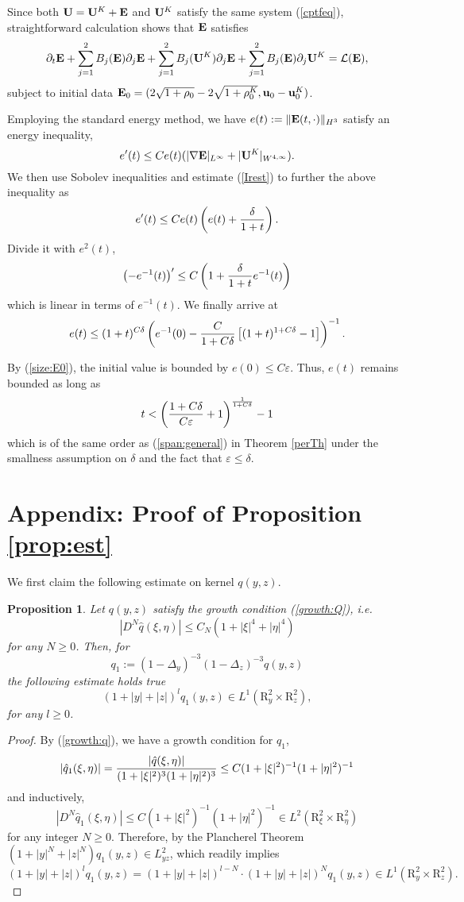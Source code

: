 \documentclass[12pt]{amsart}
\newtheorem{proposition}{Proposition}[section]
\numberwithin{equation}{section} \numberwithin{theorem}{section}
\numberwithin{example}{section} \numberwithin{remark}{section}
\numberwithin{figure}{section} \numberwithin{algorithm}{section}
\def\ep{\varepsilon}
\def\be{\begin{equation}}
\def\ee{\end{equation}}
\def\vu{{\bf u}}
\def\vU{{\bf U}}
\def\vE{{\bf E}}
\def\pa{\partial}
\def\cL{{\mathcal L}}
\def\mR{\mbox{R}}
\def\veps{\varepsilon}
\def\rhoK{\rho^K}
\def\vuK{{\bf u}^K}
\begin{document}
Since both $\vU=\vU^K+\vE$ and $\vU^{K}$ satisfy the same system (\ref{cptfeq}), straightforward calculation shows that $\vE$ satisfies
\[\pa_t\vE+\sum_{j=1}^2B_j(\vE)\pa_j\vE+\sum_{j=1}^2B_j(\vU^K)\pa_j\vE+\sum_{j=1}^2B_j(\vE)\pa_j\vU^K=\cL(\vE),\]
subject to initial data $\vE_0=(2\sqrt{1+\rho_0}-2\sqrt{1+\rhoK_0}, \vu_0-\vuK_0)$.

Employing the standard energy method, we have $e(t):=\|\vE(t,\cdot)\|_{H^3}$ satisfy an energy inequality,
\[e'(t)\le Ce(t)(|\nabla\vE|_{L^\infty}+|\vU^K|_{W^{4,\infty}}).\]
We then use Sobolev inequalities and estimate (\ref{Irest}) to further the above inequality as
\[e'(t)\le Ce(t)\left(e(t)+{\delta\over1+t}\right).\]
Divide it with $e^2(t)$,
\[\left(-e^{-1}(t)\right)'\le C\left(1+{\delta\over1+t}e^{-1}(t)\right)\]which is linear in terms of $e^{-1}(t)$. We finally arrive at
\[e(t)\le(1+t)^{C\delta}\left(e^{-1}(0)-{C\over 1+C\delta}\left[(1+t)^{1+C\delta}-1\right]\right)^{-1}.\]

By (\ref{size:E0}), the initial value is bounded by $e(0)\le C\ep$. Thus, $e(t)$ remains bounded as long as\[t<\left({1+C\delta\over C\veps}+1\right)^{1\over1+C\delta}-1\]
which is of the same order as (\ref{span:general}) in Theorem \ref{perTh} under the smallness assumption on $\delta$ and the fact that $\veps\le\delta$.

\section{Appendix: Proof of Proposition \ref{prop:est}}
We first claim the following estimate on kernel $q(y,z)$.
\begin{proposition}\label{prop:kernel}Let $q(y,z)$ satisfy the growth
condition (\ref{growth:Q}), i.e.
\be\label{growth:q}|D^N\hat{q}(\xi,\eta)|\le
C_N(1+|\xi|^4+|\eta|^4)\ee for any $N\geq 0$. Then, for
\be\label{def:q1}q_1:=(1-\Delta_y)^{-3}(1-\Delta_z)^{-3}q(y,z)\ee
the following estimate holds true
\[
(1+|y|+|z|)^lq_1(y,z)\in L^1(\mR^2_y\times\mR^2_z),
\]
for any $l\geq 0$.
 \end{proposition}
\begin{proof}By (\ref{growth:q}), we have a growth condition for $q_1$,
\[|\hat{q}_1(\xi,\eta)|={|\hat{q}(\xi,\eta)|\over(1+|\xi|^2)^3(1+|\eta|^2)^3}
\le C(1+|\xi|^2)^{-1}(1+|\eta|^2)^{-1}\] and inductively,
\[|D^{N}\hat{q}_1(\xi,\eta)|\le C(1+|\xi|^2)^{-1}(1+|\eta|^2)^{-1}\in
L^2(\mR^2_\xi\times\mR^2_\eta)\] for any integer $N\ge0$. Therefore, by the Plancherel Theorem
$(1+|y|^N+|z|^N)q_1(y,z)\in L^2_{yz}$, which readily implies
\[
(1+|y|+|z|)^l q_1(y,z)=(1+|y|+|z|)^{l-N}\cdot
(1+|y|+|z|)^Nq_1(y,z)\in L^1(\mR^2_y\times\mR^2_z).
\]
\end{proof}
\end{document}
